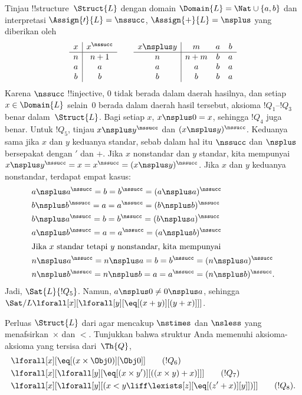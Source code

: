 \documentclass[../../../include/open-logic-section]{subfiles}
\begin{document}
\begin{ex}
 Tinjau !!{structure}~$\Struct{L}$ dengan domain
$\Domain{L} = \Nat \cup \{a, b\}$ dan interpretasi
$\Assign{\prime}{L} = \nssucc$, $\Assign{+}{L} = \nsplus$ yang diberikan
oleh
\[
\begin{array}{c|c}
  x & x^\nssucc \\
  \hline
  n & n+1 \\
  a & a\\
  b & b
\end{array}
\qquad
\begin{array}{c|ccc}
  x \nsplus y & m & a & b\\
  \hline
  n & n+m & b & a\\
  a & a & b & a\\
  b & b & b & a
\end{array}
\]
Karena $\nssucc$ !!{injective}, $0$ tidak berada dalam daerah hasilnya, dan
setiap $x \in \Domain{L}$ selain~$0$ berada dalam daerah hasil tersebut,
aksioma $!Q_1$--$!Q_3$ benar dalam~$\Struct{L}$. Bagi setiap $x$,
$x \nsplus 0 = x$, sehingga $!Q_4$ juga benar. Untuk $!Q_5$, tinjau
$x \nsplus y^\nssucc$ dan $(x \nsplus y)^\nssucc$. Keduanya sama jika $x$
dan $y$ keduanya standar, sebab dalam hal itu $\nssucc$ dan $\nsplus$
bersepakat dengan $\prime$ dan $+$. Jika $x$ nonstandar dan $y$ standar,
kita mempunyai $x \nsplus y^\nssucc = x = x^\nssucc =
(x \nsplus y)^\nssucc$. Jika $x$ dan $y$ keduanya nonstandar, terdapat empat
kasus:
\begin{align*}
&  a \nsplus a^\nssucc  = b = b^\nssucc = (a \nsplus a)^\nssucc\\
&  b \nsplus b^\nssucc  = a = a^\nssucc = (b \nsplus b)^\nssucc\\
&  b \nsplus a^\nssucc  = b = b^\nssucc = (b \nsplus a)^\nssucc\\
&  a \nsplus b^\nssucc  = a = a^\nssucc = (a \nsplus b)^\nssucc\\
\intertext{Jika $x$ standar tetapi $y$ nonstandar, kita mempunyai}
&  n \nsplus a^\nssucc  = n \nsplus a = b = b^\nssucc =
  (n \nsplus a)^\nssucc\\
&  n \nsplus b^\nssucc  = n \nsplus b = a = a^\nssucc =
  (n \nsplus b)^\nssucc.
\end{align*}
Jadi, $\Sat{L}{!Q_5}$. Namun, $a \nsplus 0 \neq 0 \nsplus a$, sehingga
$\Sat/{L}{\lforall[x][\lforall[y][\eq[(x+y)][(y+x)]]]}$.
\end{ex}

\begin{prob}
Perluas $\Struct{L}$ dari  agar
mencakup $\nstimes$ dan $\nsless$ yang menafsirkan~$\times$ dan $<$.
Tunjukkan bahwa struktur Anda memenuhi aksioma-aksioma yang tersisa
dari~$\Th{Q}$,
\begin{align*}
& \lforall[x][\eq[(x \times \Obj 0)][\Obj 0]] \tag{$!Q_6$}\\ &
  \lforall[x][\lforall[y][\eq[(x \times y')][((x \times y) + x)]]]
  \tag{$!Q_7$}\\ & \lforall[x][\lforall[y][(x < y \liff
  \lexists[z][\eq[(z'+x)][y]])]] \tag{$!Q_8$}.
\end{align*}
\end{prob}
\end{document}
